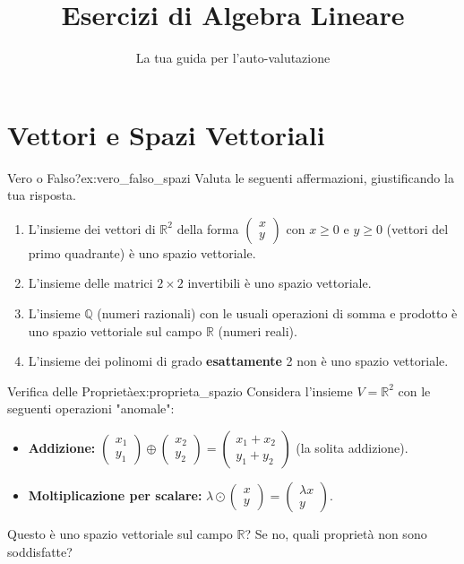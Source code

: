 \documentclass{article}
\title{Esercizi di Algebra Lineare}
\author{La tua guida per l'auto-valutazione}
\begin{document}
\maketitle

{
    \hypersetup{linkcolor=black}
    \tableofcontents
}

\section{Vettori e Spazi Vettoriali}

\begin{exercise}{Vero o Falso?}{ex:vero_falso_spazi}
    Valuta le seguenti affermazioni, giustificando la tua risposta.
    \begin{enumerate}
        \item L'insieme dei vettori di $\mathbb{R}^2$ della forma $\begin{pmatrix} x \\ y \end{pmatrix}$ con $x \ge 0$ e $y \ge 0$ (vettori del primo quadrante) è uno spazio vettoriale.
        \item L'insieme delle matrici $2 \times 2$ invertibili è uno spazio vettoriale.
        \item L'insieme $\mathbb{Q}$ (numeri razionali) con le usuali operazioni di somma e prodotto è uno spazio vettoriale sul campo $\mathbb{R}$ (numeri reali).
        \item L'insieme dei polinomi di grado \textbf{esattamente} 2 non è uno spazio vettoriale.
    \end{enumerate}
\end{exercise}

\begin{exercise}{Verifica delle Proprietà}{ex:proprieta_spazio}
    Considera l'insieme $V = \mathbb{R}^2$ con le seguenti operazioni "anomale":
    \begin{itemize}
        \item \textbf{Addizione:} $\begin{pmatrix} x_1 \\ y_1 \end{pmatrix} \oplus \begin{pmatrix} x_2 \\ y_2 \end{pmatrix} = \begin{pmatrix} x_1+x_2 \\ y_1+y_2 \end{pmatrix}$ (la solita addizione).
        \item \textbf{Moltiplicazione per scalare:} $\lambda \odot \begin{pmatrix} x \\ y \end{pmatrix} = \begin{pmatrix} \lambda x \\ y \end{pmatrix}$.
    \end{itemize}
    Questo è uno spazio vettoriale sul campo $\mathbb{R}$? Se no, quali proprietà non sono soddisfatte?
\end{exercise}
\end{document}
